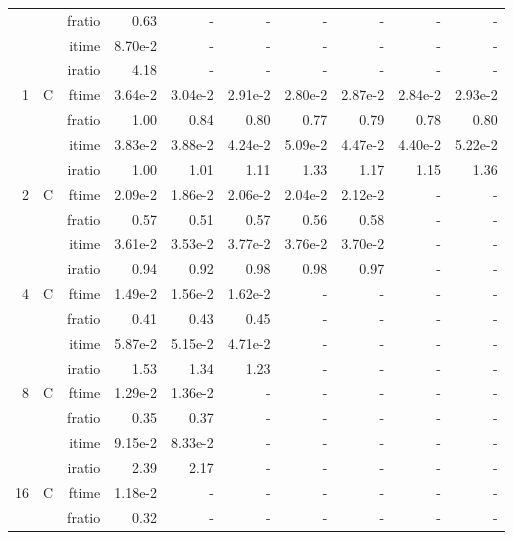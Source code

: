 \documentclass[a4paper]{article}
\begin{document}
\begin{table}[htbp]
\begin{center}
\begin{small}
\begin{tabular}{|r|r|r|r|r|r|r|r|r|r|}
           &          & fratio &   0.63 &  - &  - &  - &  - &  - &  - \\
           &          & itime &   8.70e-2 &  - &  - &  - &  - &  - &  - \\
           &          & iratio &   4.18 &  - &  - &  - &  - &  - &  - \\\hline\hline
   1 &  C &  ftime &   3.64e-2 &   3.04e-2 &   2.91e-2 &   2.80e-2 &   2.87e-2 &   2.84e-2 &   2.93e-2 \\
           &          & fratio &   1.00 &   0.84 &   0.80 &   0.77 &   0.79 &   0.78 &   0.80 \\
           &          & itime &   3.83e-2 &   3.88e-2 &   4.24e-2 &   5.09e-2 &   4.47e-2 &   4.40e-2 &   5.22e-2 \\
           &          & iratio &   1.00 &   1.01 &   1.11 &   1.33 &   1.17 &   1.15 &   1.36 \\\hline
   2 &  C &  ftime &   2.09e-2 &   1.86e-2 &   2.06e-2 &   2.04e-2 &   2.12e-2 &  - &  - \\
           &          & fratio &   0.57 &   0.51 &   0.57 &   0.56 &   0.58 &  - &  - \\
           &          & itime &   3.61e-2 &   3.53e-2 &   3.77e-2 &   3.76e-2 &   3.70e-2 &  - &  - \\
           &          & iratio &   0.94 &   0.92 &   0.98 &   0.98 &   0.97 &  - &  - \\\hline
   4 &  C &  ftime &   1.49e-2 &   1.56e-2 &   1.62e-2 &  - &  - &  - &  - \\
           &          & fratio &   0.41 &   0.43 &   0.45 &  - &  - &  - &  - \\
           &          & itime &   5.87e-2 &   5.15e-2 &   4.71e-2 &  - &  - &  - &  - \\
           &          & iratio &   1.53 &   1.34 &   1.23 &  - &  - &  - &  - \\\hline
   8 &  C &  ftime &   1.29e-2 &   1.36e-2 &  - &  - &  - &  - &  - \\
           &          & fratio &   0.35 &   0.37 &  - &  - &  - &  - &  - \\
           &          & itime &   9.15e-2 &   8.33e-2 &  - &  - &  - &  - &  - \\
           &          & iratio &   2.39 &   2.17 &  - &  - &  - &  - &  - \\\hline
   16 & C &  ftime &   1.18e-2 &  - &  - &  - &  - &  - &  - \\
           &          & fratio &   0.32 &  - &  - &  - &  - &  - &  - \\

\end{tabular}
\end{small}
\end{center}
\end{table}
\end{document}
